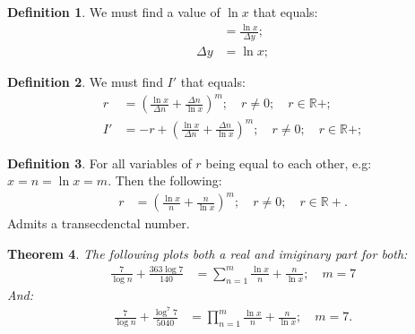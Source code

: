\documentclass[10pt]{article}
\theoremstyle{plain}
\newtheorem{theorem}{Theorem}[section]
\theoremstyle{definition}
\newtheorem{definition}[theorem]{Definition}
\theoremstyle{remark}
\begin{document}
\begin{definition}
	We must find a value of $\ln x$ that equals:
	\begin{align*}
		&= \frac{\ln x}{\Delta y};\\
		\Delta y &= \ln x;
	\end{align*}
\end{definition}

\begin{definition}
	We must find $I'$ that equals:
	\begin{align*}
		r &= ( \frac{\ln x}{\Delta n} + \frac{\Delta n}{\ln x})^m; \quad r \neq 0; \quad r \in \mathbb{R}{+};\\
		I' &= - r + ( \frac{\ln x}{\Delta n} + \frac{\Delta n}{\ln x})^m; \quad r \neq 0; \quad r \in \mathbb{R}{+};
	\end{align*}
\end{definition}

\begin{definition}
	For all variables of $r$ being equal to each other, e.g: $x =n = \ln x = m.$ Then the following:
	\begin{align*}
		r &= ( \frac{\ln x}{n} + \frac{n}{\ln x})^m; \quad r \neq 0; \quad r \in \mathbb{R}{+}.
	\end{align*}
	Admits a transecdenctal number.
\end{definition}

\begin{theorem}
	The following plots both a real and imiginary part for both:
	\begin{align*}
		\frac{7}{\log n} + \frac{363 \log 7}{140} &= \sum_{n=1}^{m} \frac{\ln x}{n} + \frac{n}{\ln x}; \quad m = 7
	\end{align*}
	And:
	\begin{align*}
		\frac{7}{\log n} + \frac{\log^{7} 7}{5040} &= \prod_{n=1}^{m} \frac{\ln x}{n} + \frac{n}{\ln x}; \quad m = 7.
	\end{align*}
\end{theorem}

\nocite{*}



\end{document}
